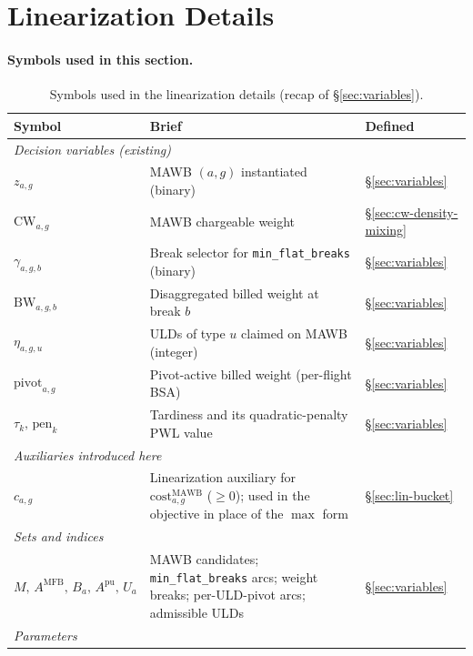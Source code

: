 \documentclass[11pt,a4paper]{article}
\theoremstyle{definition}
\begin{document}
\section{Linearization Details}
\label{sec:linearization}

\paragraph{Symbols used in this section.}
\begin{table}[H]
\centering
\caption{Symbols used in the linearization details (recap of \S\ref{sec:variables}).}
\label{tab:linearization-syms}
\begin{tabular}{lp{9cm}p{3.5cm}}
\toprule
Symbol & Brief & Defined \\
\midrule
\multicolumn{3}{l}{\textit{Decision variables (existing)}} \\
$z_{a,g}$ & MAWB $(a, g)$ instantiated (binary) & \S\ref{sec:variables} \\
$\text{CW}_{a,g}$ & MAWB chargeable weight & \S\ref{sec:cw-density-mixing} \\
$\gamma_{a,g,b}$ & Break selector for \texttt{min\_flat\_breaks} (binary) & \S\ref{sec:variables} \\
$\text{BW}_{a,g,b}$ & Disaggregated billed weight at break $b$ & \S\ref{sec:variables} \\
$\eta_{a,g,u}$ & ULDs of type $u$ claimed on MAWB (integer) & \S\ref{sec:variables} \\
$\text{pivot}_{a,g}$ & Pivot-active billed weight (per-flight BSA) & \S\ref{sec:variables} \\
$\tau_k,\, \text{pen}_k$ & Tardiness and its quadratic-penalty PWL value & \S\ref{sec:variables} \\
\multicolumn{3}{l}{\textit{Auxiliaries introduced here}} \\
$c_{a,g}$ & Linearization auxiliary for $\text{cost}^{\text{MAWB}}_{a,g}$ ($\geq 0$); used in the objective in place of the $\max$ form & \S\ref{sec:lin-bucket} \\
\midrule
\multicolumn{3}{l}{\textit{Sets and indices}} \\
$M,\, A^{\text{MFB}},\, B_a,\, A^{\text{pu}},\, U_a$ & MAWB candidates; \texttt{min\_flat\_breaks} arcs; weight breaks; per-ULD-pivot arcs; admissible ULDs & \S\ref{sec:variables} \\
\midrule
\multicolumn{3}{l}{\textit{Parameters}} \\

\end{tabular}
\end{table}
\end{document}
